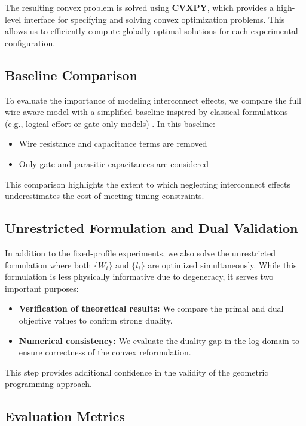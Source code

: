 \documentclass{article}
\begin{document}
The resulting convex problem is solved using \textbf{CVXPY}, which provides a high-level interface for specifying and solving convex optimization problems. This allows us to efficiently compute globally optimal solutions for each experimental configuration.

\subsection{Baseline Comparison}

To evaluate the importance of modeling interconnect effects, we compare the full wire-aware model with a simplified baseline inspired by classical formulations (e.g., logical effort or gate-only models) \cite{baseline}. In this baseline:

\begin{itemize}
    \item Wire resistance and capacitance terms are removed
    \item Only gate and parasitic capacitances are considered
\end{itemize}

This comparison highlights the extent to which neglecting interconnect effects underestimates the cost of meeting timing constraints.

\subsection{Unrestricted Formulation and Dual Validation}

In addition to the fixed-profile experiments, we also solve the unrestricted formulation where both $\{W_i\}$ and $\{l_i\}$ are optimized simultaneously. While this formulation is less physically informative due to degeneracy, it serves two important purposes:

\begin{itemize}
    \item \textbf{Verification of theoretical results:} We compare the primal and dual objective values to confirm strong duality.
    \item \textbf{Numerical consistency:} We evaluate the duality gap in the log-domain to ensure correctness of the convex reformulation.
\end{itemize}

This step provides additional confidence in the validity of the geometric programming approach.

\subsection{Evaluation Metrics}
\end{document}
